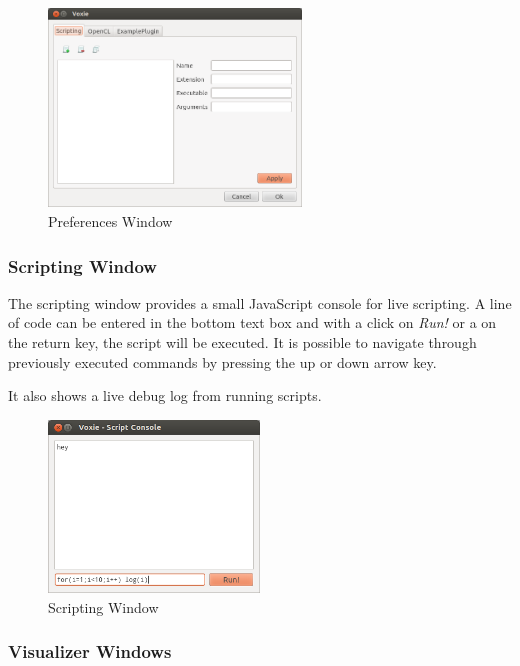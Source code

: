 \begin{figure}[h]
  \centering
  \includegraphics[width=0.6\textwidth]{img/preferences-script.png}
  \caption{Preferences Window}
\end{figure}

\subsubsection{Scripting Window}
\label{scripting-window}

The scripting window provides a small JavaScript console for live scripting.
A line of code can be entered in the bottom text box and with a click on \emph{Run!}
or a on the return key, the script will be executed.
It is possible to navigate through previously executed commands by pressing the up or
down arrow key.

It also shows a live debug log from running scripts.

\begin{figure}[h]
  \centering
  \includegraphics[width=0.5\textwidth]{img/script-console.png}
  \caption{Scripting Window}
\end{figure}


\subsubsection{Visualizer Windows}

